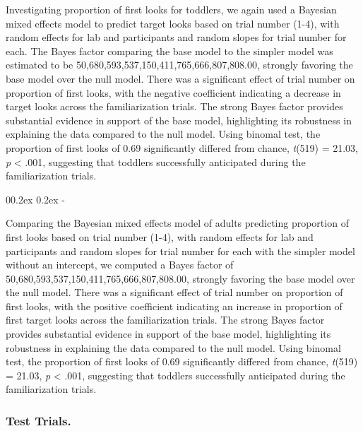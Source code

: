 \documentclass[
  english,
  man,floatsintext]{apa6}
\makeatletter
\let\oldsubparagraph\subparagraph
\renewcommand{\subparagraph}[1]{\oldsubparagraph{#1}\mbox{}}
\renewcommand{\subparagraph}[1]{\@startsection{subparagraph}{5}{1em}%
  {0\baselineskip \@plus 0.2ex \@minus 0.2ex}%
  {-\z@\relax}%
  {\normalfont\normalsize\itshape\hspace{\parindent}{#1}\textit{\addperi}}{\relax}}
\makeatother
\begin{document}
Investigating proportion of first looks for toddlers, we again used a Bayesian mixed effects model to predict target looks based on trial number (1-4), with random effects for lab and participants and random slopes for trial number for each. The Bayes factor comparing the base model to the simpler model was estimated to be 50,680,593,537,150,411,765,666,807,808.00, strongly favoring the base model over the null model. There was a significant effect of trial number on proportion of first looks, with the negative coefficient indicating a decrease in target looks across the familiarization trials. The strong Bayes factor provides substantial evidence in support of the base model, highlighting its robustness in explaining the data compared to the null model. Using binomal test, the proportion of first looks of 0.69 significantly differed from chance, \emph{t}(519) = 21.03, \emph{p} \textless{} .001, suggesting that toddlers successfully anticipated during the familiarization trials.

\hypertarget{adults-1}{%
\subparagraph{Adults}\label{adults-1}}

Comparing the Bayesian mixed effects model of adults predicting proportion of first looks based on trial number (1-4), with random effects for lab and participants and random slopes for trial number for each with the simpler model without an intercept, we computed a Bayes factor of 50,680,593,537,150,411,765,666,807,808.00, strongly favoring the base model over the null model. There was a significant effect of trial number on proportion of first looks, with the positive coefficient indicating an increase in proportion of first target looks across the familiarization trials. The strong Bayes factor provides substantial evidence in support of the base model, highlighting its robustness in explaining the data compared to the null model. Using binomal test, the proportion of first looks of 0.69 significantly differed from chance, \emph{t}(519) = 21.03, \emph{p} \textless{} .001, suggesting that toddlers successfully anticipated during the familiarization trials.

\hypertarget{test-trials.}{%
\subsubsection{Test Trials.}\label{test-trials.}}
\end{document}
